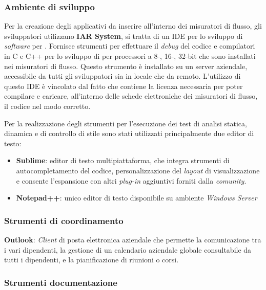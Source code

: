 \subsubsection*{Ambiente di sviluppo}

Per la creazione degli applicativi da inserire all'interno dei misuratori di flusso, gli sviluppatori utilizzano \textbf{IAR System}, si tratta di un IDE per lo sviluppo di \textit{software} per . Fornisce strumenti per effettuare il \textit{debug} del codice e compilatori in C e C++ per lo sviluppo di  per processori a 8-, 16-, 32-bit che sono installati nei misuratori di flusso.
Questo strumento è installato su un server aziendale, accessibile da tutti gli sviluppatori sia in locale che da remoto.
L'utilizzo di questo IDE è vincolato dal fatto che contiene la licenza necessaria per poter compilare e caricare, all'interno delle schede elettroniche dei misuratori di flusso, il codice nel modo corretto.

Per la realizzazione degli strumenti per l'esecuzione dei test di analisi statica, dinamica e di controllo di stile sono stati utilizzati principalmente due editor di testo:
	 \begin{itemize}
	 
	 \item \textbf{Sublime}: editor di testo  multipiattaforma, che integra strumenti di autocompletamento del codice, personalizzazione del \textit{layout} di visualizzazione e consente l'espansione con altri \textit{plug-in} aggiuntivi forniti dalla \textit{comunity}.
	 \item \textbf{Notepad++}: unico editor di testo disponibile su ambiente \textit{Windows Server}
	 \end{itemize}
	
	
\subsubsection*{Strumenti di coordinamento}

\textbf{Outlook}: \textit{Client} di posta elettronica aziendale che permette la comunicazione tra i vari dipendenti, la gestione di un calendario aziendale globale consultabile da tutti i dipendenti, e la pianificazione di riunioni o corsi.

	
	\subsubsection*{Strumenti documentazione}

